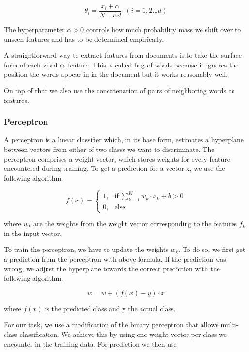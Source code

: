 \documentclass[11pt]{article}
\begin{document}
\begin{equation}
\theta_i = \frac{x_i + \alpha}{ N + \alpha d} \;\; (i = 1,2...d)
\end{equation}

The hyperparameter $\alpha>0$ controls how much probability mass we shift over to
unseen features and has to be determined empirically.

A straightforward way to extract features from documents is to take the surface
form of each word as feature.
This is called bag-of-words because it ignores the position the words appear in
in the document but it works reasonably well.

On top of that we also use the concatenation of pairs of neighboring words as
features.

\subsubsection{Perceptron}
\label{sssec:perceptron}

A perceptron is a linear classifier which, in its base form, estimates a
hyperplane between vectors from either of two classs we want to discriminate.
The perceptron comprises a weight vector, which stores weights for every feature
encountered during training. To get a prediction for a vector x, we use the
following algorithm.

\begin{equation}
  f(x) = \begin{cases}
    1, & \text{if}\ \sum_{k=1}^K w_k \cdot x_k + b > 0\\
    0, & \text{else}
         \end{cases}
\end{equation}

where $w_k$ are the weights from the weight vector corresponding to the features
$f_k$ in the input vector.

To train the perceptron, we have to update the weights $w_k$. To do so, we first
get a prediction from the perceptron with above formula. If the prediction was
wrong, we adjust the hyperplane towards the correct prediction with the
following algorithm.

\begin{equation}
  w = w + (f(x) - y) \cdot x
\end{equation}

where $f(x)$ is the predicted class and y the actual class.

For our task, we use a modification of the binary perceptron that allows
multi-class classification.
We achieve this by using one weight vector per class we encounter in the
training data. For prediction we then use
\end{document}
